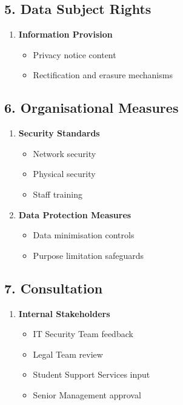 \documentclass[14pt,a4paper]{article}
\begin{document}
\vspace{0.5em}
\begin{multicols}{2}
\subsection*{5. Data Subject Rights}
\begin{enumerate}
    \item \textbf{Information Provision}
    \begin{itemize}
        \item Privacy notice content
        \item Rectification and erasure mechanisms
    \end{itemize}
\end{enumerate}

\subsection*{6. Organisational Measures}
\begin{enumerate}
    \item \textbf{Security Standards}
    \begin{itemize}
        \item Network security
        \item Physical security
        \item Staff training
    \end{itemize}

    \item \textbf{Data Protection Measures}
    \begin{itemize}
        \item Data minimisation controls
        \item Purpose limitation safeguards
    \end{itemize}
\end{enumerate}

\subsection*{7. Consultation}
\begin{enumerate}
    \item \textbf{Internal Stakeholders}
    \begin{itemize}
        \item IT Security Team feedback
        \item Legal Team review
        \item Student Support Services input
        \item Senior Management approval
    \end{itemize}


\end{enumerate}
\end{multicols}
\end{document}
